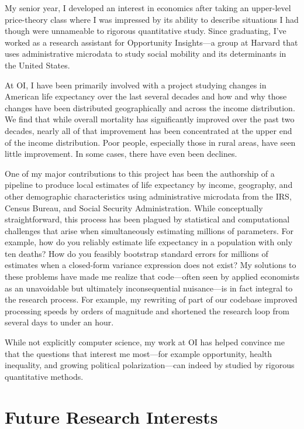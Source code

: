 \documentclass{grad-statement}
\begin{document}
My senior year, I developed an interest in economics after taking an upper-level price-theory class where I was impressed by its ability to describe situations I had though were unnameable to rigorous quantitative study.
Since graduating, I've worked as a research assistant for Opportunity Insights---a group at Harvard that uses administrative microdata to study social mobility and its determinants in the United States.

At OI, I have been primarily involved with a project studying changes in American life expectancy over the last several decades and how and why those changes have been distributed geographically and across the income distribution.
We find that while overall mortality has significantly improved over the past two decades, nearly all of that improvement has been concentrated at the upper end of the income distribution.
Poor people, especially those in rural areas, have seen little improvement.
In some cases, there have even been declines.

One of my major contributions to this project has been the authorship of a pipeline to produce local estimates of life expectancy by income, geography, and other demographic characteristics using administrative microdata from the IRS, Census Bureau, and Social Security Administration.
While conceptually straightforward, this process has been plagued by statistical and computational challenges that arise when simultaneously estimating millions of parameters.
For example, how do you reliably estimate life expectancy in a population with only ten deaths?
How do you feasibly bootstrap standard errors for millions of estimates when a closed-form variance expression does not exist?
My solutions to these problems have made me realize that code---often seen by applied economists as an unavoidable but ultimately inconsequential nuisance---is in fact integral to the research process.
For example, my rewriting of part of our codebase improved processing speeds by orders of magnitude and shortened the research loop from several days to under an hour.

While not explicitly computer science, my work at OI has helped convince me that the questions that interest me most---for example opportunity, health inequality, and growing political polarization---can indeed by studied by rigorous quantitative methods.

\section{Future Research Interests}
\end{document}
